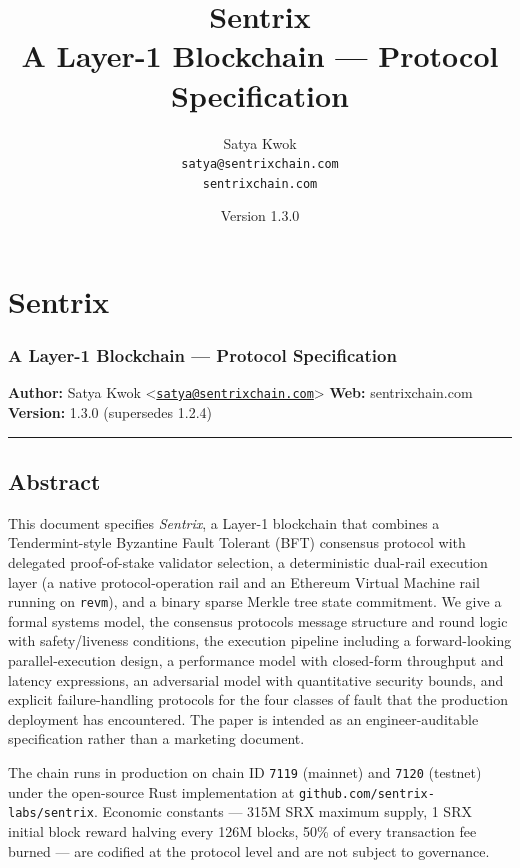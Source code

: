 \documentclass[11pt,a4paper]{article}
\title{\textbf{Sentrix}\\[2pt]\large A Layer-1 Blockchain --- Protocol Specification}
\author{Satya Kwok \\ \texttt{satya@sentrixchain.com} \\ \texttt{sentrixchain.com}}
\date{Version 1.3.0}
\begin{document}
\maketitle
\tableofcontents
\newpage

\hypertarget{sentrix}{%
\section{Sentrix}\label{sentrix}}

\hypertarget{a-layer-1-blockchain--protocol-specification}{%
\subsubsection{A Layer-1 Blockchain --- Protocol
Specification}\label{a-layer-1-blockchain--protocol-specification}}

\textbf{Author:} Satya Kwok
\textless{}\href{mailto:satya@sentrixchain.com}{\nolinkurl{satya@sentrixchain.com}}\textgreater{}
\textbf{Web:} sentrixchain.com \textbf{Version:} 1.3.0 (supersedes
1.2.4)

\begin{center}\rule{0.5\linewidth}{0.5pt}\end{center}

\hypertarget{abstract}{%
\subsection{Abstract}\label{abstract}}

This document specifies \emph{Sentrix}, a Layer-1 blockchain that
combines a Tendermint-style Byzantine Fault Tolerant (BFT) consensus
protocol with delegated proof-of-stake validator selection, a
deterministic dual-rail execution layer (a native protocol-operation
rail and an Ethereum Virtual Machine rail running on \texttt{revm}), and
a binary sparse Merkle tree state commitment. We give a formal systems
model, the consensus protocol\textquotesingle s message structure and
round logic with safety/liveness conditions, the execution pipeline
including a forward-looking parallel-execution design, a performance
model with closed-form throughput and latency expressions, an
adversarial model with quantitative security bounds, and explicit
failure-handling protocols for the four classes of fault that the
production deployment has encountered. The paper is intended as an
engineer-auditable specification rather than a marketing document.

The chain runs in production on chain ID \texttt{7119} (mainnet) and
\texttt{7120} (testnet) under the open-source Rust implementation at
\texttt{github.com/sentrix-labs/sentrix}. Economic constants --- 315M
SRX maximum supply, 1 SRX initial block reward halving every 126M
blocks, 50\% of every transaction fee burned --- are codified at the
protocol level and are not subject to governance.
\end{document}
